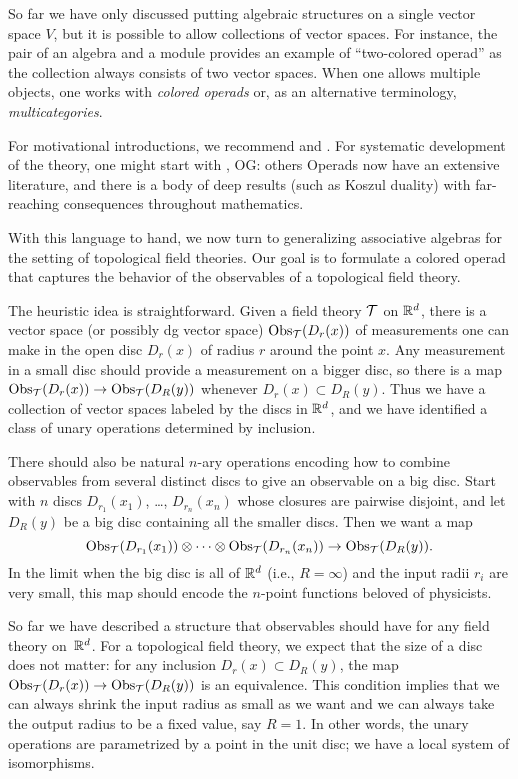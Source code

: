 \documentclass[11pt]{amsart}
\def\owen#1{{\textcolor{violet!65!black}{OG: {#1}}}}
\begin{document}
So far we have only discussed putting algebraic structures on a single vector space $V$,
but it is possible to allow collections of vector spaces.
For instance, the pair of an algebra and a module provides an example of ``two-colored operad'' as the collection always consists of two vector spaces.
When one allows multiple objects, one works with {\em colored operads} or, as an alternative terminology, {\em multicategories}.

\begin{rmk}
For motivational introductions, we recommend \cite{StashAMS} and \cite{Val12}.
For systematic development of the theory, one might start with \cite{LodVal}, \owen{others}
Operads now have an extensive literature, and there is a body of deep results (such as Koszul duality) with far-reaching consequences throughout mathematics.
\end{rmk}

With this language to hand, we now turn to generalizing associative algebras for the setting of topological field theories. 
Our goal is to formulate a colored operad that captures the behavior of the observables of a topological field theory.

The heuristic idea is straightforward.
Given a field theory $\mathcal T$ on $\mathbb R^d$, there is a vector space (or possibly dg vector space) ${\rm Obs}_\mathcal T(D_r(x))$ of measurements one can make in the open disc $D_r(x)$ of radius $r$ around the point $x$.
Any measurement in a small disc should provide a measurement on a bigger disc,
so there is a map ${\rm Obs}_\mathcal T(D_r(x)) \to {\rm Obs}_\mathcal T(D_R(y))$ whenever $D_r(x) \subset D_R(y)$.
Thus we have a collection of vector spaces labeled by the discs in $\mathbb R^d$,
and we have identified a class of unary operations determined by inclusion.

There should also be natural $n$-ary operations encoding how to combine observables from several distinct discs to give an observable on a big disc.
Start with $n$ discs $D_{r_1}(x_1)$, \dots , $D_{r_n}(x_n)$ whose closures are pairwise disjoint, and let $D_R(y)$ be a big disc containing all the smaller discs.
Then we want a map
\[
{\rm Obs}_\mathcal T(D_{r_1}(x_1)) \otimes \cdots \otimes {\rm Obs}_\mathcal T(D_{r_n}(x_n)) \to {\rm Obs}_\mathcal T(D_R(y)).
\]
In the limit when the big disc is all of $\mathbb R^d$ (i.e., $R = \infty$) and the input radii $r_i$ are very small, 
this map should encode the $n$-point functions beloved of physicists.

So far we have described a structure that observables should have for any field theory on~$\mathbb R^d$.
For a topological field theory, we expect that the size of a disc does not matter:
for any inclusion $D_r(x) \subset D_R(y)$, the map ${\rm Obs}_\mathcal T(D_r(x)) \to {\rm Obs}_\mathcal T(D_R(y))$ is an equivalence.
This condition implies that we can always shrink the input radius as small as we want and we can always take the output radius to be a fixed value, say $R =1$.
In other words, the unary operations are parametrized by a point in the unit disc;
we have a local system of isomorphisms.
\end{document}
